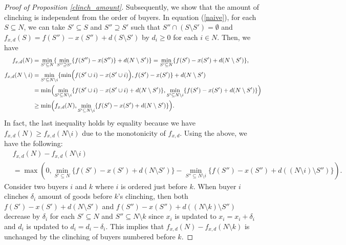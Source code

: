\documentclass[letterpaper,11pt]{article}
\begin{document}
\begin{proof}[Proof of Proposition \ref{clinch_amount}]
Subsequently, we show that the amount of clinching is independent from the order of buyers.
In equation (\ref{naive}), for each $S\subseteq N$, 
we can take $S'\subseteq S$ and $S''\supseteq S'$ 
such that $S''\cap (S\setminus S')=\emptyset$ and 
$f_{x,d}(S)=f(S'')-x(S'')+d(S\setminus S')$ 
by $d_i\geq 0$ for each $i\in N$.
Then, we have
\begin{align*}
f_{x,d}(N)&=\min_{S'\subseteq N}\{\min_{S''\supseteq S'}\{f(S'')-x(S'')\}+d(N\setminus S')\}=\min_{S'\subseteq N}\{f(S')-x(S')+d(N\setminus S')\}, \\
f_{x,d}(N\setminus i)&=\min_{S'\subseteq N\setminus i}
\{\min\Bigl(f(S'\cup i)-x(S'\cup i)\Bigr), f(S')-x(S')\}+d(N\setminus S') \\
&= \min\Bigl(\min_{S'\subseteq N\setminus i}
\{f(S'\cup i)-x(S'\cup i)+d(N\setminus S')\}, 
\min_{S'\subseteq N\setminus i} \{f(S')-x(S')+d(N\setminus S')\}\Bigr)\\
&\geq \min\Bigl(f_{x,d}(N), \min_{S'\subseteq N\setminus i} 
\{f(S')-x(S')+d(N\setminus S')\}\Bigr).
\end{align*}
In fact, the last inequality holds by equality because we have $f_{x,d}(N)\geq f_{x,d}(N\setminus i)$ due to  
the monotonicity of $f_{x,d}$. 
Using the above, we have the following:
\begin{align*}
&f_{x,d}(N)-f_{x,d}(N\setminus i)\\
&=\max(0, \min_{S'\subseteq N}\{f(S')-x(S')+d(N\setminus S')\}-\min_{S''\subseteq N\setminus i}\{f(S'')-x(S'')+d((N\setminus i)\setminus S'')\}).
\end{align*}
Consider two buyers $i$ and $k$ where $i$ is ordered just before $k$.
When buyer $i$ clinches $\delta_i$ amount of goods before $k$'s clinching, 
then both $f(S')-x(S')+d(N\setminus S')$ and 
$f(S'')-x(S'')+d((N\setminus k)\setminus S'')$ decrease by $\delta_i$ for each 
$S'\subseteq N$ and $S''\subseteq N\setminus k$ 
since $x_i$ is updated to $x_i=x_i+\delta_i$ and $d_i$ is updated to $d_i=d_i-\delta_i$.
This implies that $f_{x,d}(N)-f_{x,d}(N\setminus k)$ is unchanged by the clinching of buyers numbered before $k$.
\end{proof}




\end{document}
